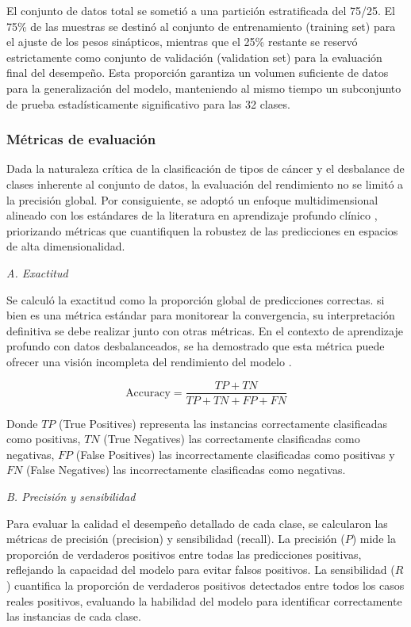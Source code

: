 \documentclass[review,12pt,times,number]{elsarticle}
\begin{document}
El conjunto de datos total se sometió a una partición estratificada del 75/25. El 75\% de las muestras se destinó al conjunto de entrenamiento (training set) para el ajuste de los pesos sinápticos, mientras que el 25\% restante se reservó estrictamente como conjunto de validación (validation set) para la evaluación final del desempeño. Esta proporción garantiza un volumen suficiente de datos para la generalización del modelo, manteniendo al mismo tiempo un subconjunto de prueba estadísticamente significativo para las 32 clases.

\subsubsection{Métricas de evaluación}

Dada la naturaleza crítica de la clasificación de tipos de cáncer y el desbalance de clases inherente al conjunto de datos, la evaluación del rendimiento no se limitó a la precisión global. Por consiguiente, se adoptó un enfoque multidimensional alineado con los estándares de la literatura en aprendizaje profundo clínico \cite{grandini2020metrics}, priorizando métricas que cuantifiquen la robustez de las predicciones en espacios de alta dimensionalidad.

\textit{A. Exactitud}

Se calculó la exactitud como la proporción global de predicciones correctas. si bien es una métrica estándar para monitorear la convergencia, su interpretación definitiva se debe realizar junto con otras métricas. En el contexto de aprendizaje profundo con datos desbalanceados, se ha demostrado que esta métrica puede ofrecer una visión incompleta del rendimiento del modelo \cite{johnson2019survey}.

\begin{equation*}
    \text{Accuracy} = \frac{TP + TN}{TP + TN + FP + FN}
\end{equation*}

Donde $TP$ (True Positives) representa las instancias correctamente clasificadas como positivas, $TN$ (True Negatives) las correctamente clasificadas como negativas, $FP$ (False Positives) las incorrectamente clasificadas como positivas y $FN$ (False Negatives) las incorrectamente clasificadas como negativas.

\textit{B. Precisión y sensibilidad}

Para evaluar la calidad el desempeño detallado de cada clase, se calcularon las métricas de precisión (precision) y sensibilidad (recall). La precisión ($P$) mide la proporción de verdaderos positivos entre todas las predicciones positivas, reflejando la capacidad del modelo para evitar falsos positivos. La sensibilidad ($R$) cuantifica la proporción de verdaderos positivos detectados entre todos los casos reales positivos, evaluando la habilidad del modelo para identificar correctamente las instancias de cada clase.
\end{document}
